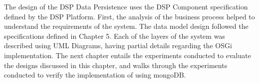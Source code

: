 The design of the DSP Data Persistence uses the DSP Component specification
defined by the DSP Platform. First, the analysis of the business process
helped to understand the requirements of the system. The data model design
followed the specifications defined in Chapter 5. Each of the layers of the
system was described using UML Diagrams, having partial details regarding the
OSGi implementation. The next chapter entails the experiments conducted to
evaluate the designs discussed in this chapter, and walks through the
experiments conducted to verify the implementation of using mongoDB.
